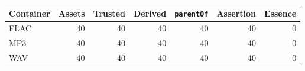 \begin{tabular}{lrrrrrr}
\toprule
Container & Assets & Trusted & Derived & \texttt{parentOf} & Assertion & Essence \\
\midrule
FLAC & 40 & 40 & 40 & 40 & 40 & 0 \\
MP3 & 40 & 40 & 40 & 40 & 40 & 0 \\
WAV & 40 & 40 & 40 & 40 & 40 & 0 \\
\bottomrule
\end{tabular}

